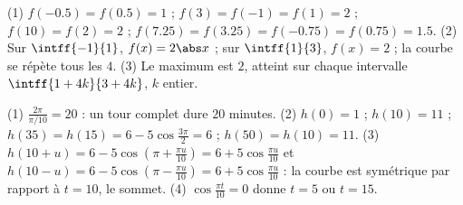 \begin{solution}
(1) $f(-\num{0,5})=f(\num{0,5})=1$ ; $f(3)=f(-1)=f(1)=2$ ; $f(10)=f(2)=2$ ; $f(\num{7,25})=f(\num{3,25})=f(-\num{0,75})=f(\num{0,75})=\num{1,5}$. (2) Sur $\intff{-1}{1}$, $f(x)=2\abs x$ ; sur $\intff{1}{3}$, $f(x)=2$ ; la courbe se répète tous les $4$. (3) Le maximum est $2$, atteint sur chaque intervalle $\intff{1+4k}{3+4k}$, $k$ entier.
\end{solution}
\begin{solution}
(1) $\frac{2\pi}{\pi/10}=20$ : un tour complet dure $20$ minutes. (2) $h(0)=1$ ; $h(10)=11$ ; $h(35)=h(15)=6-5\cos\frac{3\pi}{2}=6$ ; $h(50)=h(10)=11$. (3) $h(10+u)=6-5\cos(\pi+\frac{\pi u}{10})=6+5\cos\frac{\pi u}{10}$ et $h(10-u)=6-5\cos(\pi-\frac{\pi u}{10})=6+5\cos\frac{\pi u}{10}$ : la courbe est symétrique par rapport à $t=10$, le sommet. (4) $\cos\frac{\pi t}{10}=0$ donne $t=5$ ou $t=15$.
\end{solution}
